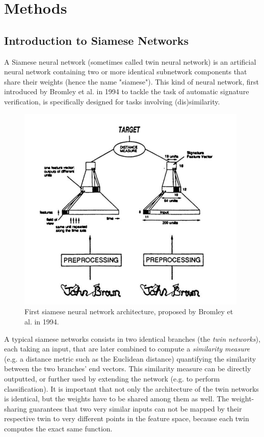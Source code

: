 \documentclass[11pt]{report}
\begin{document}
\newpage


\chapter{Methods}

\section{Introduction to Siamese Networks}

A Siamese neural network (sometimes called twin neural network) is an artificial neural network containing two or more identical subnetwork components that share their weights (hence the name "siamese"). This kind of neural network, first introduced by Bromley et al. in 1994 \cite{bromley94} to tackle the task of automatic signature verification, is specifically designed for tasks involving (dis)similarity.\newline

\begin{figure}[H]
\centering\includegraphics[width=11cm]{siamese94.PNG}
\caption{First siamese neural network architecture, proposed by Bromley et al. in 1994.}
\label{papyrus}
\end{figure}

A typical siamese networks consists in two identical branches (the \emph{twin networks}), each taking an input, that are later combined to compute a \emph{similarity measure} (e.g. a distance metric such as the Euclidean distance) quantifying the similarity between the two branches' end vectors. This similarity measure can be directly outputted, or further used by extending the network (e.g. to perform classification).\newline
It is important that not only the architecture of the twin networks is identical, but the weights have to be shared among them as well. The weight-sharing guarantees that two very similar inputs can not be  mapped  by  their  respective  twin  to  very different points in the feature space, because each twin computes the exact same function.\newline
\end{document}
